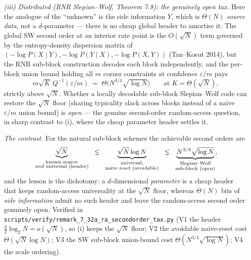 \documentclass[
]{article}
\begin{document}
\emph{(iii) Distributed (RNR Slepian--Wolf, Theorem 7.8): the genuinely open tax.}
Here the analogue of the ``unknown'' is the side information $Y$, which is $\Theta(N)$
\emph{source data}, not a $d$-parameter --- there is no cheap global header to amortise
it. The global SW second order at an interior rate point is the $O(\sqrt N)$ term
governed by the entropy-density dispersion matrix of
$(-\log P(X\mid Y),-\log P(Y\mid X),-\log P(X,Y))$ (Tan--Kosut 2014), but the RNR
sub-block construction decodes each block independently, and the per-block union bound
holding all $m$ corner constraints at confidence $\varepsilon/m$ pays
\[
  m\sqrt K\,Q^{-1}(\varepsilon/m) \;=\; \Theta\!\big(N^{3/4}\sqrt{\log N}\big)
  \qquad\text{at } K=\Theta(\sqrt N),
\]
strictly above $\sqrt N$. Whether a locally decodable sub-block Slepian--Wolf code can
restore the $\sqrt N$ floor (sharing typicality slack across blocks instead of a naive
$\varepsilon/m$ union bound) is \emph{open} --- the genuine second-order random-access
question, in sharp contrast to (i), where the cheap parameter header settles it.

\emph{The contrast.} For the natural sub-block schemes the achievable second orders are
\[
  \underbrace{\sqrt N}_{\substack{\text{known source}\\ \text{\emph{and} universal (header)}}}
  \;\;\lneq\;\;
  \underbrace{\sqrt N\log N}_{\substack{\text{universal,}\\ \text{naive reset (avoidable)}}}
  \;\;\lneq\;\;
  \underbrace{N^{3/4}\sqrt{\log N}}_{\substack{\text{Slepian--Wolf}\\ \text{sub-block (open)}}} ,
\]
and the lesson is the dichotomy: a $d$-dimensional \emph{parameter} is a cheap header
that keeps random-access universality at the $\sqrt N$ floor, whereas $\Theta(N)$ bits
of \emph{side information} admit no such header and leave the random-access second order
genuinely open. Verified in
\texttt{scripts/verify/remark\_7\_32a\_ra\_secondorder\_tax.py} (V1 the header
$\tfrac d2\log_2 N=o(\sqrt N)$, so (i) keeps the $\sqrt N$ floor; V2 the avoidable
naive-reset cost $\Theta(\sqrt N\log N)$; V3 the SW sub-block union-bound cost
$\Theta(N^{3/4}\sqrt{\log N})$; V4 the scale ordering).
\end{document}
